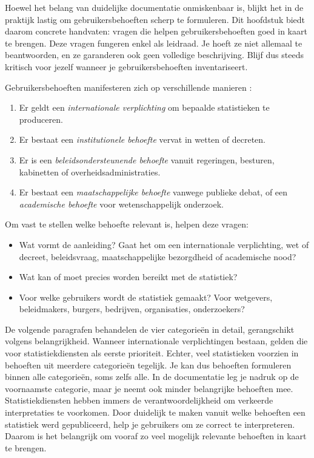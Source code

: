 \documentclass[\mainfiledir/00_handleiding_statistiekproductie.tex]{subfiles}
\begin{document}
Hoewel het belang van duidelijke documentatie onmiskenbaar is, blijkt het in de praktijk lastig om gebruikersbehoeften scherp te formuleren. Dit hoofdstuk biedt daarom concrete handvaten: vragen die helpen gebruikersbehoeften goed in kaart te brengen. Deze vragen fungeren enkel als leidraad.  Je hoeft ze niet allemaal te beantwoorden, en ze garanderen ook geen volledige beschrijving. Blijf dus steeds kritisch voor jezelf wanneer je gebruikersbehoeften inventariseert.

Gebruikersbehoeften manifesteren zich op verschillende manieren \parencite{Eurostat2021ESShandbookmetadata}:
\begin{enumerate}
    \item Er geldt een \emph{internationale verplichting} om bepaalde statistieken te produceren.
    \item Er bestaat een \emph{institutionele behoefte} vervat in wetten of decreten. 
    \item Er is een \emph{beleidsondersteunende behoefte} vanuit regeringen, besturen, kabinetten of overheidsadministraties.
    \item Er bestaat een \emph{maatschappelijke behoefte} vanwege publieke debat, of een \emph{academische behoefte} voor wetenschappelijk onderzoek.
\end{enumerate}
Om vast te stellen welke behoefte relevant is, helpen deze vragen:
\begin{itemize}[nosep]
	\item Wat vormt de aanleiding? Gaat het om een internationale verplichting, wet of decreet, beleidsvraag, maatschappelijke bezorgdheid of academische nood?
	\item Wat kan of moet precies worden bereikt met de statistiek?
	\item Voor welke gebruikers wordt de statistiek gemaakt? Voor wetgevers, beleidmakers, burgers, bedrijven, organisaties, onderzoekers?
\end{itemize}

De volgende paragrafen behandelen de vier categorieën in detail, gerangschikt volgens belangrijkheid. Wanneer internationale verplichtingen bestaan, gelden die voor statistiekdiensten als eerste prioriteit. Echter, veel statistieken voorzien in behoeften uit meerdere categorieën tegelijk. Je kan dus behoeften formuleren binnen alle categorieën, soms zelfs alle. In de documentatie leg je nadruk op de voornaamste categorie, maar je neemt ook minder belangrijke behoeften mee. Statistiekdiensten hebben immers de verantwoordelijkheid om verkeerde interpretaties te voorkomen. Door duidelijk te maken vanuit welke behoeften een statistiek werd gepubliceerd, help je gebruikers om ze correct te interpreteren. Daarom is het belangrijk om vooraf zo veel mogelijk relevante behoeften in kaart te brengen. 
\end{document}
